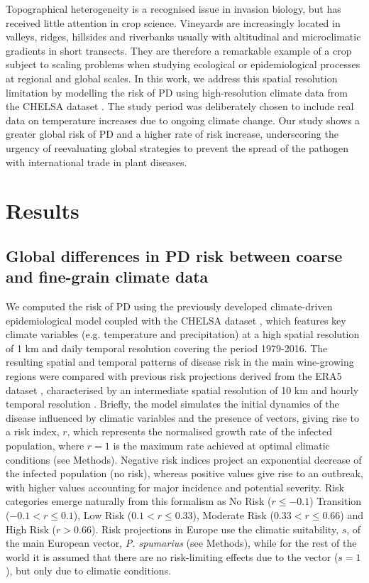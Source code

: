 Topographical heterogeneity is a recognised issue in invasion biology, but
has received little attention in crop science.	Vineyards are increasingly
located in valleys, ridges, hillsides and riverbanks usually with altitudinal
and microclimatic gradients in short transects.  They are therefore a
remarkable example of  a crop subject to scaling problems when studying
ecological or epidemiological processes at  regional and global scales.  In
this work, we address this spatial resolution limitation by modelling the risk
of PD  using high-resolution climate data from the CHELSA dataset
\cite{Karger2017}. The study period was deliberately chosen  to include real
data on temperature increases due to ongoing climate change.  Our study shows a
greater global risk of PD and a higher rate of risk increase, underscoring the
urgency of reevaluating global strategies to prevent the spread of the pathogen
with international trade in plant diseases.

\section{Results}

\subsection{Global differences in  PD risk between coarse and fine-grain
    climate data}

We computed the risk of PD using the previously developed climate-driven
epidemiological model \cite{GimenezRomero2022_CommsBio} coupled with the CHELSA
dataset
\cite{Karger2017}, which features key climate variables (e.g. temperature and
precipitation) at a high spatial resolution of 1 km and daily temporal
resolution covering the period 1979-2016. The resulting spatial and temporal
patterns of disease risk in the main wine-growing regions were compared with
previous risk projections derived from the ERA5 dataset
\cite{munoz-sabater_era5-land_2021}, characterised by an intermediate  spatial
resolution of 10 km  and hourly temporal resolution
\cite{GimenezRomero2022_CommsBio}.
Briefly, the model simulates the initial dynamics of the disease  influenced by
climatic variables and the presence of vectors, giving rise to a risk index,
$r$, which represents the normalised growth rate of the infected population,
where $r=1$ is the maximum rate achieved at optimal climatic conditions (see
Methods). Negative risk indices project an exponential decrease of the infected
population (no risk), whereas positive values give rise to an outbreak, with
higher values accounting for major incidence and potential severity. Risk
categories  emerge naturally from this formalism as No Risk ($r\leq-0.1$)
Transition ($-0.1<r \leq0.1$), Low Risk ($0.1<r\leq0.33$), Moderate Risk
($0.33<r\leq0.66$) and High Risk ($r>0.66$). Risk projections in Europe use the
climatic suitability, $s$, of the main European vector, \textit{P. spumarius}
(see Methods), while for the rest of the world it is assumed that there are no
risk-limiting effects due to the vector  ($s=1$), but only due to climatic
conditions.

